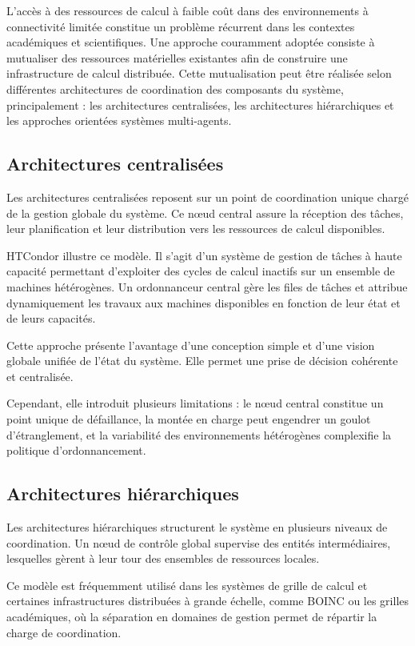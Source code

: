 \documentclass[12pt,a4paper]{report}
\begin{document}
L'accès à des ressources de calcul à faible coût dans des environnements à connectivité limitée constitue un problème récurrent dans les contextes académiques et scientifiques. Une approche couramment adoptée consiste à mutualiser des ressources matérielles existantes afin de construire une infrastructure de calcul distribuée. Cette mutualisation peut être réalisée selon différentes architectures de coordination des composants du système, principalement : les architectures centralisées, les architectures hiérarchiques et les approches orientées systèmes multi-agents.

\subsection{Architectures centralisées}

Les architectures centralisées reposent sur un point de coordination unique chargé de la gestion globale du système. Ce nœud central assure la réception des tâches, leur planification et leur distribution vers les ressources de calcul disponibles.

HTCondor \cite{htcondor} illustre ce modèle. Il s'agit d'un système de gestion de tâches à haute capacité permettant d'exploiter des cycles de calcul inactifs sur un ensemble de machines hétérogènes. Un ordonnanceur central gère les files de tâches et attribue dynamiquement les travaux aux machines disponibles en fonction de leur état et de leurs capacités.

Cette approche présente l'avantage d'une conception simple et d'une vision globale unifiée de l'état du système. Elle permet une prise de décision cohérente et centralisée.

Cependant, elle introduit plusieurs limitations : le nœud central constitue un point unique de défaillance, la montée en charge peut engendrer un goulot d'étranglement, et la variabilité des environnements hétérogènes complexifie la politique d'ordonnancement.

\subsection{Architectures hiérarchiques}

Les architectures hiérarchiques structurent le système en plusieurs niveaux de coordination. Un nœud de contrôle global supervise des entités intermédiaires, lesquelles gèrent à leur tour des ensembles de ressources locales.

Ce modèle est fréquemment utilisé dans les systèmes de grille de calcul et certaines infrastructures distribuées à grande échelle, comme BOINC \cite{seti} ou les grilles académiques, où la séparation en domaines de gestion permet de répartir la charge de coordination.
\end{document}
